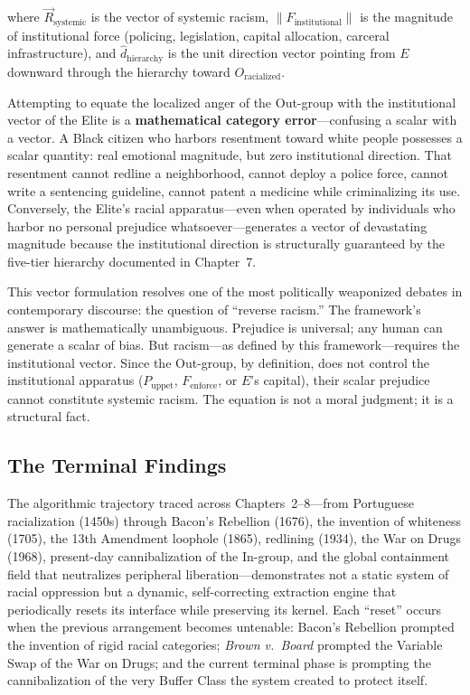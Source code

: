 \documentclass[12pt,openany]{book}
\begin{document}
\noindent where $\vec{R}_{\text{systemic}}$ is the vector of systemic racism, $\left\| F_{\text{institutional}} \right\|$ is the magnitude of institutional force (policing, legislation, capital allocation, carceral infrastructure), and $\hat{d}_{\text{hierarchy}}$ is the unit direction vector pointing from $E$ downward through the hierarchy toward $O_{\text{racialized}}$.

Attempting to equate the localized anger of the Out-group with the institutional vector of the Elite is a \textbf{mathematical category error}---confusing a scalar with a vector. A Black citizen who harbors resentment toward white people possesses a scalar quantity: real emotional magnitude, but zero institutional direction. That resentment cannot redline a neighborhood, cannot deploy a police force, cannot write a sentencing guideline, cannot patent a medicine while criminalizing its use. Conversely, the Elite's racial apparatus---even when operated by individuals who harbor no personal prejudice whatsoever---generates a vector of devastating magnitude because the institutional direction is structurally guaranteed by the five-tier hierarchy documented in Chapter~7.

This vector formulation resolves one of the most politically weaponized debates in contemporary discourse: the question of ``reverse racism.'' The framework's answer is mathematically unambiguous. Prejudice is universal; any human can generate a scalar of bias. But racism---as defined by this framework---requires the institutional vector. Since the Out-group, by definition, does not control the institutional apparatus ($P_{\text{uppet}}$, $F_{\text{enforce}}$, or $E$'s capital), their scalar prejudice cannot constitute systemic racism. The equation is not a moral judgment; it is a structural fact.

\subsection*{The Terminal Findings}

The algorithmic trajectory traced across Chapters~2--8---from Portuguese racialization (1450s) through Bacon's Rebellion (1676), the invention of whiteness (1705), the 13th Amendment loophole (1865), redlining (1934), the War on Drugs (1968), present-day cannibalization of the In-group, and the global containment field that neutralizes peripheral liberation---demonstrates not a static system of racial oppression but a dynamic, self-correcting extraction engine that periodically resets its interface while preserving its kernel. Each ``reset'' occurs when the previous arrangement becomes untenable: Bacon's Rebellion prompted the invention of rigid racial categories; \textit{Brown v.\ Board} prompted the Variable Swap of the War on Drugs; and the current terminal phase is prompting the cannibalization of the very Buffer Class the system created to protect itself.
\end{document}
